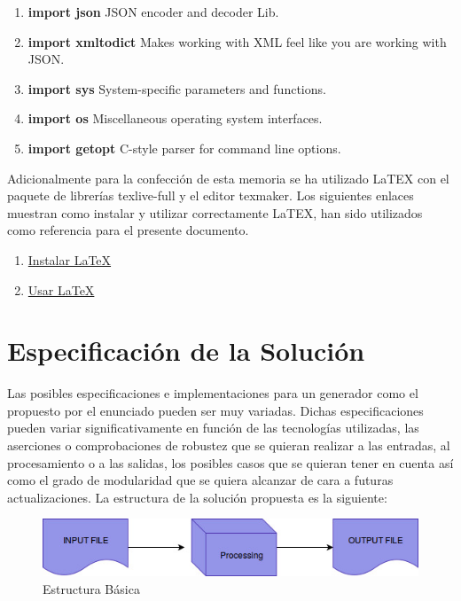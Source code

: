 \documentclass[a4paper,11pt]{book}
\begin{document}
\begin{enumerate}
\item \textbf{import json} JSON encoder and decoder Lib\cite{json_lib}.
\item \textbf{import xmltodict} Makes working with XML feel like you are working with JSON\cite{xmltodic_lib}.
\item \textbf{import sys} System-specific parameters and functions\cite{sys_lib}.
\item \textbf{import os} Miscellaneous operating system interfaces\cite{os_lib}.
\item \textbf{import getopt} C-style parser for command line options\cite{getopt_lib}.
\end{enumerate}

Adicionalmente para la confección de esta memoria se ha utilizado LaTEX con el paquete de librerías texlive-full y el editor texmaker. Los siguientes enlaces muestran como instalar y utilizar correctamente LaTEX, han sido utilizados como referencia para el presente documento. 

\begin{enumerate}
\item \href{http://milq.github.io/install-latex-ubuntu-debian/}{Instalar LaTeX}
\item \href{ http://minisconlatex.blogspot.com.es/}{Usar LaTeX}
\end{enumerate}
 
 



\section{Especificación de la Solución}

Las posibles especificaciones e implementaciones para un generador como el propuesto por el enunciado pueden ser muy variadas. Dichas especificaciones pueden variar significativamente en función de las tecnologías utilizadas, las aserciones o comprobaciones de robustez que se quieran realizar a las entradas, al procesamiento o a las salidas, los posibles casos que se quieran tener en cuenta así como el grado de modularidad que se quiera alcanzar de cara a futuras actualizaciones. La estructura de la solución propuesta es la siguiente:

\begin{figure}[htbpH]  
\centering 
\includegraphics[scale=0.35]{imagenes/pipe.jpeg}
\caption{ Estructura Básica  }  
\end{figure} 
\end{document}
